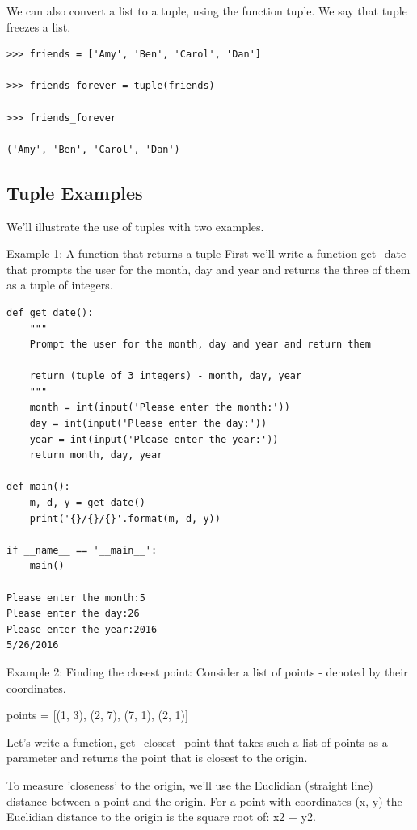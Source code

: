 \documentclass{article}
\begin{document}
We can also convert a list to a tuple, using the function tuple.  We say that tuple freezes a list.

\begin{lstlisting}
>>> friends = ['Amy', 'Ben', 'Carol', 'Dan']

>>> friends_forever = tuple(friends)

>>> friends_forever

('Amy', 'Ben', 'Carol', 'Dan')
\end{lstlisting}

\subsection{Tuple Examples}

We'll illustrate the use of tuples with two examples.

Example 1:  A function that returns a tuple
First we'll write a function get{\_}date that prompts the user for the month, day and year and returns the three of them as a tuple of integers.

\begin{lstlisting}
def get_date():
    """
    Prompt the user for the month, day and year and return them
 
    return (tuple of 3 integers) - month, day, year
    """
    month = int(input('Please enter the month:'))
    day = int(input('Please enter the day:'))
    year = int(input('Please enter the year:'))
    return month, day, year
 
def main():
    m, d, y = get_date()
    print('{}/{}/{}'.format(m, d, y))
 
if __name__ == '__main__':
    main()
 
Please enter the month:5
Please enter the day:26
Please enter the year:2016
5/26/2016
\end{lstlisting}

Example 2: Finding the closest point:
Consider a list of points - denoted by their coordinates.

points = [(1, 3), (2, 7), (7, 1), (2, 1)]

Let's write a function, get{\_}closest{\_}point that takes such a list of points as a parameter and returns the point that is closest to the origin.

To measure 'closeness' to the origin, we'll use the Euclidian (straight line) distance between a point and the origin.   For a point with coordinates (x, y) the Euclidian distance to the origin is the square root of: x2 + y2. 
\end{document}
